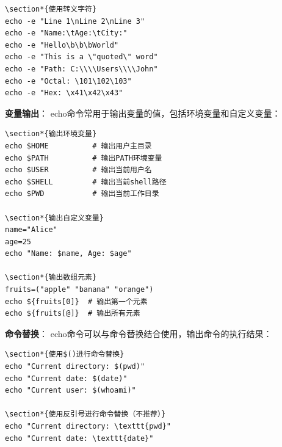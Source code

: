 \documentclass[12pt,UTF8]{ctexbook}
\begin{document}
\begin{verbatim}
\section*{使用转义字符}
echo -e "Line 1\nLine 2\nLine 3"
echo -e "Name:\tAge:\tCity:"
echo -e "Hello\b\b\bWorld"
echo -e "This is a \"quoted\" word"
echo -e "Path: C:\\\\Users\\\\John"
echo -e "Octal: \101\102\103"
echo -e "Hex: \x41\x42\x43"
\end{verbatim}

\textbf{变量输出}：
echo命令常用于输出变量的值，包括环境变量和自定义变量：

\begin{verbatim}
\section*{输出环境变量}
echo $HOME          # 输出用户主目录
echo $PATH          # 输出PATH环境变量
echo $USER          # 输出当前用户名
echo $SHELL         # 输出当前shell路径
echo $PWD           # 输出当前工作目录

\section*{输出自定义变量}
name="Alice"
age=25
echo "Name: $name, Age: $age"

\section*{输出数组元素}
fruits=("apple" "banana" "orange")
echo ${fruits[0]}  # 输出第一个元素
echo ${fruits[@]}  # 输出所有元素
\end{verbatim}

\textbf{命令替换}：
echo命令可以与命令替换结合使用，输出命令的执行结果：

\begin{verbatim}
\section*{使用$()进行命令替换}
echo "Current directory: $(pwd)"
echo "Current date: $(date)"
echo "Current user: $(whoami)"

\section*{使用反引号进行命令替换（不推荐）}
echo "Current directory: \texttt{pwd}"
echo "Current date: \texttt{date}"
\end{verbatim}
\end{document}
